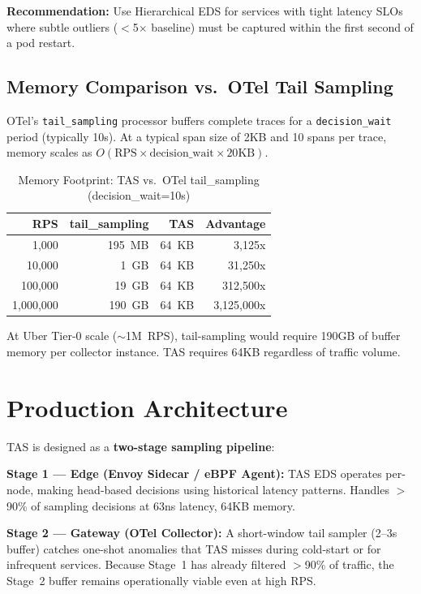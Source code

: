 \documentclass[sigconf,nonacm]{acmart}
\begin{document}
\textbf{Recommendation:} Use Hierarchical EDS for services with tight
latency SLOs where subtle outliers ($<$5$\times$ baseline) must be captured
within the first second of a pod restart.

\subsection{Memory Comparison vs.\ OTel Tail Sampling}

OTel's \texttt{tail\_sampling} processor buffers complete traces for a \texttt{decision\_wait}
period (typically 10s). At a typical span size of 2KB and 10 spans per trace, memory
scales as $O(\text{RPS} \times \text{decision\_wait} \times 20\text{KB})$.

\begin{table}[h]
\caption{Memory Footprint: TAS vs.\ OTel tail\_sampling (decision\_wait=10s)}
\label{tab:memory}
\centering
\small
\begin{tabular}{r r r r}
\toprule
\textbf{RPS} & \textbf{tail\_sampling} & \textbf{TAS} & \textbf{Advantage} \\
\midrule
1,000     & 195~MB  & 64~KB & 3,125x  \\
10,000    & 1~GB    & 64~KB & 31,250x \\
100,000   & 19~GB   & 64~KB & 312,500x \\
1,000,000 & 190~GB  & 64~KB & 3,125,000x \\
\bottomrule
\end{tabular}
\end{table}

At Uber Tier-0 scale ($\sim$1M~RPS), tail-sampling would require 190GB of buffer memory
per collector instance. TAS requires 64KB regardless of traffic volume.

\section{Production Architecture}

TAS is designed as a \textbf{two-stage sampling pipeline}:

\textbf{Stage 1 — Edge (Envoy Sidecar / eBPF Agent):} TAS EDS operates per-node,
making head-based decisions using historical latency patterns. Handles $>$90\% of
sampling decisions at 63ns latency, 64KB memory.

\textbf{Stage 2 — Gateway (OTel Collector):} A short-window tail sampler (2--3s buffer)
catches one-shot anomalies that TAS misses during cold-start or for infrequent services.
Because Stage~1 has already filtered $>$90\% of traffic, the Stage~2 buffer remains
operationally viable even at high RPS.
\end{document}
